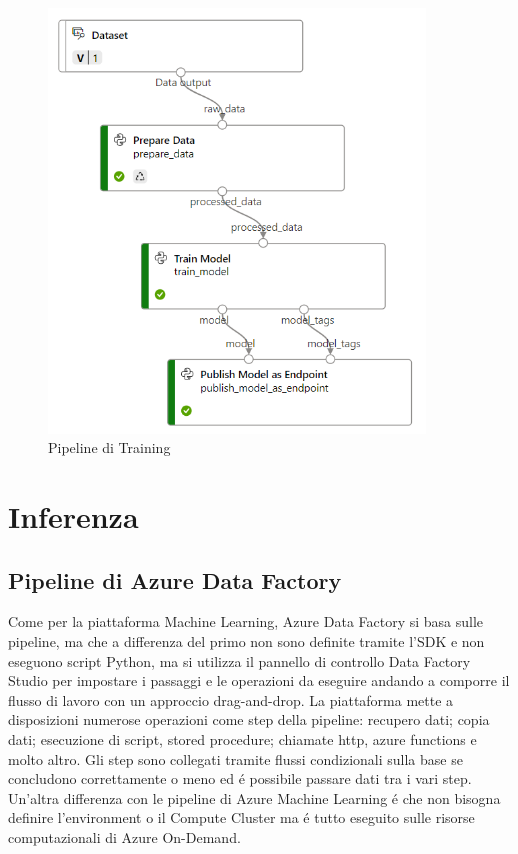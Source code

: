 \begin{figure}[t]
	\centering
	\includegraphics[width=10cm, scale=1]{images/pipeline}
	\caption{Pipeline di Training}
	\label{pipeline-training}
\end{figure}

\section{Inferenza}
\subsection{Pipeline di Azure Data Factory}
Come per la piattaforma Machine Learning, Azure Data Factory si basa sulle pipeline, ma che a differenza del primo non sono definite tramite l'SDK e non eseguono script Python, ma si utilizza il pannello di controllo Data Factory Studio per impostare i passaggi e le operazioni da eseguire andando a comporre il flusso di lavoro con un approccio drag-and-drop.
La piattaforma mette a disposizioni numerose operazioni come step della pipeline: recupero dati; copia dati; esecuzione di script, stored procedure; chiamate http, azure functions e molto altro. 
Gli step sono collegati tramite flussi condizionali sulla base se concludono correttamente o meno ed é possibile passare dati tra i vari step.
Un'altra differenza con le pipeline di Azure Machine Learning é che non bisogna definire l'environment o il Compute Cluster ma é tutto eseguito sulle risorse computazionali di Azure On-Demand.
